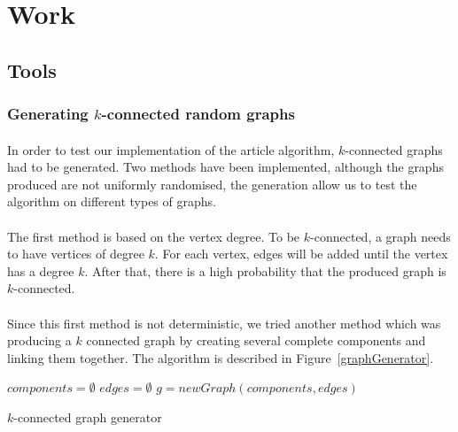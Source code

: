 \section{Work}

\subsection{Tools}
\subsubsection{Generating $k$-connected random graphs}
\paragraph{}
In order to test our implementation of the article algorithm, $k$-connected 
graphs had to be generated. Two methods have been implemented, although the
graphs produced are not uniformly randomised, the generation allow us to test
the algorithm on different types of graphs.

\paragraph{}
The first method is based on the vertex degree. To be $k$-connected, a graph
needs to have vertices of degree $k$. For each vertex, edges will be added
until the vertex has a degree $k$. After that, there is a high probability
that the produced graph is $k$-connected.

\paragraph{}
Since this first method is not deterministic, we tried another method which was
producing a $k$ connected graph by creating several complete components and
linking them together. The algorithm is described in
Figure~\ref{graphGenerator}.

\begin{algorithm}[!h]
  $components = \emptyset$\;
  $edges = \emptyset$\;
  $g = newGraph(components, edges)$\;
  \;
  \caption{\label{graphGenerator}$k$-connected graph generator}
\end{algorithm}

